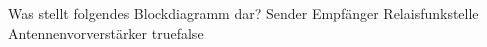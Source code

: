     {Was stellt folgendes Blockdiagramm dar?}
    {Sender}
    {Empfänger}
    {Relaisfunkstelle}
    {Antennenvorverstärker}
    {true}{false}